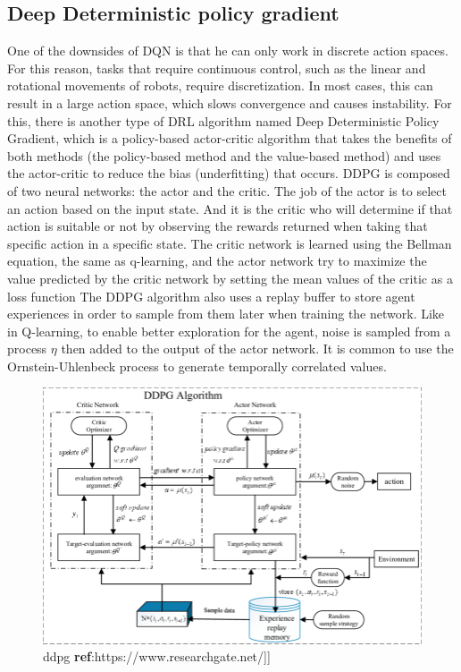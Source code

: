 \documentclass[12pt]{extarticle}
\begin{document}
\pagebreak

\subsection{Deep Deterministic policy gradient }
One of the downsides of DQN is that  he can  only work  in discrete action spaces. For this reason, tasks that require continuous control, such as the linear and rotational movements of robots, require discretization. In most cases, this can result in a large action space, which slows convergence and causes instability.
For this, there is another type of DRL algorithm named Deep Deterministic Policy Gradient, which is a policy-based actor-critic algorithm that takes the benefits of both methods (the policy-based method and the value-based method) and uses the actor-critic to reduce the bias (underfitting) that occurs.
DDPG is composed of two neural networks: the actor and the critic. The job of the actor is to select an action based on the input state. And it is the critic who will determine if that action is suitable or not by observing the rewards returned when taking that specific action in a specific state.
The critic network is learned using the Bellman equation, the same as q-learning, and the actor network try to maximize the value predicted by the critic network by setting the mean values of the critic as a loss function
The DDPG algorithm also uses a replay buffer to store agent experiences in order to sample from them later when training the network.
Like in Q-learning, to enable better exploration for the agent, noise is sampled from a process $\eta$ then added to the output of the actor network. It is common to use the Ornstein-Uhlenbeck process to generate temporally correlated values. \cite{lillicrap2015continuous}


 \begin{figure}[h] 
\centering
\includegraphics[scale=0.45]{ddpg}
\caption[ddpg]{ddpg \textbf{ref}:https://www.researchgate.net/]]}
\end{figure}
\end{document}

